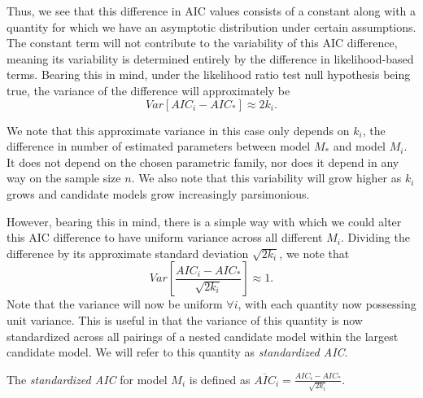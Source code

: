 		Thus, we see that this difference in AIC values consists of a constant along with a quantity for which we have an asymptotic distribution under certain
		assumptions. The constant term will not contribute to the variability of this AIC difference, meaning its variability is determined entirely by the
		difference in likelihood-based terms. Bearing this in mind, under the likelihood ratio test null hypothesis being true, the variance of the difference
		will approximately be
		\begin{equation}
			Var[AIC_i - AIC_*] \approx 2 k_i .
		\end{equation}

		We note that this approximate variance in this case only depends on $k_i$, the difference in number of estimated parameters between model $M_*$ and model $M_i$. It does not
		depend on the chosen parametric family, nor does it depend in any way on the sample size $n$. We also note that this variability will grow higher as $k_i$ grows and candidate
		models grow increasingly parsimonious.

		However, bearing this in mind, there is a simple way with which we could alter this AIC difference to have uniform variance across all different $M_i$. Dividing the difference
		by its approximate standard deviation $\sqrt{2 k_i}$, we note that
		\begin{equation}
			Var \left[ \frac{AIC_i - AIC_*}{\sqrt{2k_i}} \right] \approx 1 .
		\end{equation}
		Note that the variance will now be uniform $\forall i$, with each quantity now possessing unit variance. This is useful in that the variance of this quantity is now standardized
		across all pairings of a nested candidate model within the largest candidate model. We will refer to this quantity as \textit{standardized AIC}.

		\begin{definition}
			The \textit{standardized AIC} for model $M_i$ is defined as $\overline{AIC}_i = \frac{AIC_i - AIC_*}{\sqrt{2k_i}}$.
		\end{definition}

